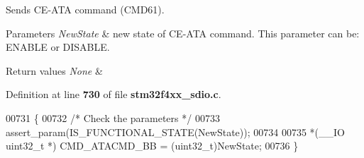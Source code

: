 Sends C\+E-\/\+A\+TA command (C\+M\+D61). 


\begin{DoxyParams}{Parameters}
{\em New\+State} & new state of C\+E-\/\+A\+TA command. This parameter can be\+: E\+N\+A\+B\+LE or D\+I\+S\+A\+B\+LE. \\
\hline
\end{DoxyParams}

\begin{DoxyRetVals}{Return values}
{\em None} & \\
\hline
\end{DoxyRetVals}


Definition at line \textbf{ 730} of file \textbf{ stm32f4xx\+\_\+sdio.\+c}.


\begin{DoxyCode}
00731 \{ 
00732   \textcolor{comment}{/* Check the parameters */}
00733   assert_param(IS_FUNCTIONAL_STATE(NewState));
00734   
00735   *(\_\_IO uint32\_t *) CMD_ATACMD_BB = (uint32\_t)NewState;
00736 \}
\end{DoxyCode}
